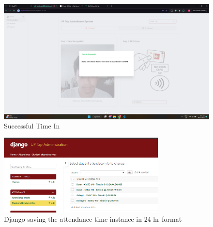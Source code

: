 \begin{figure}[h] %
	\centering
	\includegraphics[width=1.0\textwidth]{figures/chapter4/success.png} %
	\caption{Successful Time In}
	\label{fig:success}
\end{figure}
\begin{figure}[h] %
	\centering
	\includegraphics[width=0.75\textwidth]{figures/chapter4/backendrecord.png} %
	\caption{Django saving the attendance time instance in 24-hr format}
	\label{fig:record}
\end{figure}

\clearpage
